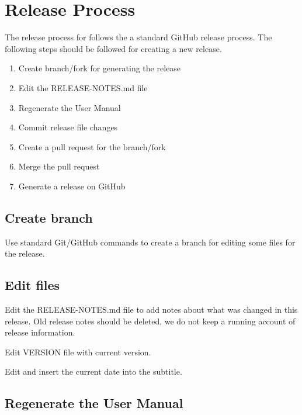 
\chapter{Release Process}
\label{Release Process}

The release process for \parflow{} follows the a standard GitHub
release process.  The following steps should be followed for creating a new
\parflow{} release.

\begin{enumerate}
	\item Create branch/fork for generating the release
	\item Edit the RELEASE-NOTES.md file
	\item Regenerate the \parflow{} User Manual
        \item Commit release file changes
        \item Create a pull request for the branch/fork
        \item Merge the pull request
        \item Generate a release on GitHub
\end{enumerate}


\section{Create branch}

Use standard Git/GitHub commands to create a branch for editing some files for the release.

\section{Edit files}

Edit the RELEASE-NOTES.md file to add notes about what was changed in
this release.  Old release notes should be deleted, we do not keep a
running account of release information.

Edit VERSION file with current version.

Edit  and insert the current date
into the subtitle.

\section{Regenerate the \parflow{} User Manual}

